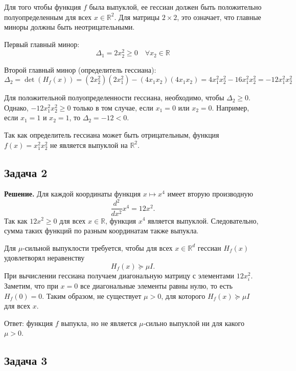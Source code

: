 \documentclass[a4paper,12pt]{article}
\begin{document}
	Для того чтобы функция $f$ была выпуклой, ее гессиан должен быть положительно полуопределенным для всех $x \in \mathbb{R}^2$. Для матрицы $2 \times 2$, это означает, что главные миноры должны быть неотрицательными.
	
	Первый главный минор:
	$$
	\Delta_1 = 2x_2^2 \ge 0 \quad \forall x_2 \in \mathbb{R}
	$$
	
	Второй главный минор (определитель гессиана):
	$$
	\Delta_2 = \det(H_f(x)) = (2x_2^2)(2x_1^2) - (4x_1 x_2)(4x_1 x_2) = 4x_1^2 x_2^2 - 16x_1^2 x_2^2 = -12x_1^2 x_2^2
	$$
	
	Для положительной полуопределенности гессиана, необходимо, чтобы $\Delta_2 \ge 0$. Однако, $-12x_1^2 x_2^2 \ge 0$ только в том случае, если $x_1 = 0$ или $x_2 = 0$. Например, если $x_1 = 1$ и $x_2 = 1$, то $\Delta_2 = -12 < 0$.
	
	Так как определитель гессиана может быть отрицательным, функция $f(x) = x_1^2 x_2^2$ не является выпуклой на $\mathbb{R}^2$.
	
	
	
	\subsection*{Задача 2}

	\textbf{Решение.} Для каждой координаты функция $x\mapsto x^4$ имеет вторую производную
	\[
	\frac{d^2}{dx^2} x^4 = 12x^2.
	\]
	Так как $12x^2\ge 0$ для всех $x\in\mathbb{R}$, функция $x^4$ является выпуклой. Следовательно, сумма таких функций по разным координатам также выпукла.
	
	Для $\mu$-сильной выпуклости требуется, чтобы для всех $x\in\mathbb{R}^d$ гессиан $H_f(x)$ удовлетворял неравенству
	\[
	H_f(x) \succeq \mu I.
	\]
	При вычислении гессиана получаем диагональную матрицу с элементами $12x_i^2$. Заметим, что при $x=0$ все диагональные элементы равны нулю, то есть $H_f(0)=0$. Таким образом, не существует $\mu>0$, для которого $H_f(x)\succeq \mu I$ для всех $x$. 
	
	Ответ: функция $f$ выпукла, но не является $\mu$-сильно выпуклой ни для какого $\mu>0$.
	
	\vspace{0.5em}
	
	\subsection*{Задача 3}
\end{document}
